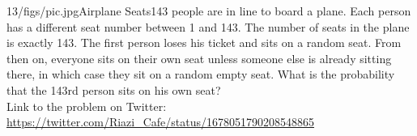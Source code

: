 \begin{problem}{13/figs/pic.jpg}{Airplane Seats}143 people are in line to board a plane. Each person has a different seat number between 1 and 143. The number of seats in the plane is exactly 143. The first person loses his ticket and sits on a random seat. From then on, everyone sits on their own seat unless someone else is already sitting there, in which case they sit on a random empty seat. What is the probability that the 143rd person  sits on his own seat?\\[0.2cm]

Link to the problem on Twitter:  \url{https://twitter.com/Riazi_Cafe/status/1678051790208548865}\end{problem}